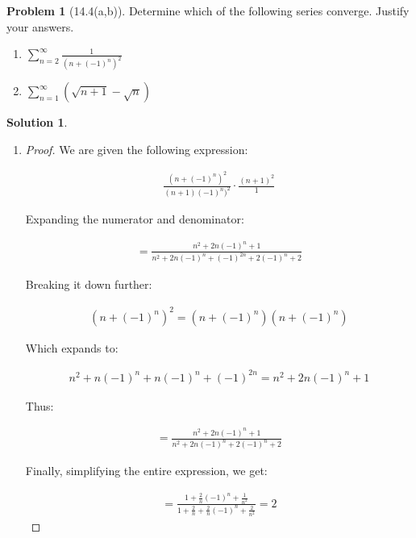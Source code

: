 \documentclass[12pt]{article}
\theoremstyle{definition} %
\newtheorem{solution}{Solution}
\newtheorem{problem}{Problem}
\theoremstyle{plain} %
\begin{document}
\begin{problem}[14.4(a,b)]
   Determine which of the following series converge. Justify your answers.
\begin{enumerate}
    \item $\sum_{n=2}^{\infty} \frac{1}{\left( n+(-1)^{n}  \right)^{2}  }$ 
    \item $\sum_{n=1}^{\infty}\left( \sqrt{n+1}-\sqrt{n}   \right)  $ 
\end{enumerate}
    
\end{problem}
   \begin{solution}
      \begin{enumerate}
         \item \begin{proof}
            We are given the following expression:
      
      \begin{align}
      \frac{(n+(-1)^n)^2}{(n+1)(-1)^n)^2} \cdot \frac{(n+1)^2}{1}
      \end{align}
      
      Expanding the numerator and denominator:
      
      \begin{align}
      = \frac{n^2 + 2n(-1)^n + 1}{n^2 + 2n(-1)^n + (-1)^{2n} + 2(-1)^n + 2}
      \end{align}
      
      Breaking it down further:
      
      \begin{align}
      (n + (-1)^n)^2 = (n + (-1)^n)(n + (-1)^n)
      \end{align}
      
      Which expands to:
      
      \begin{align}
      n^2 + n(-1)^n + n(-1)^n + (-1)^{2n} = n^2 + 2n(-1)^n + 1
      \end{align}
      
      Thus:
      
      \begin{align}
      = \frac{n^2 + 2n(-1)^n + 1}{n^2 + 2n(-1)^n + 2(-1)^n + 2}
      \end{align}
      
      Finally, simplifying the entire expression, we get:
      
      \begin{align}
      = \frac{1 + \frac{2}{n}(-1)^n + \frac{1}{n^2}}{1 + \frac{2}{n} + \frac{2}{n}(-1)^n + \frac{2}{n^2}} = 2
      \end{align}
      

\end{proof}
\end{enumerate}
\end{solution}
\end{document}
